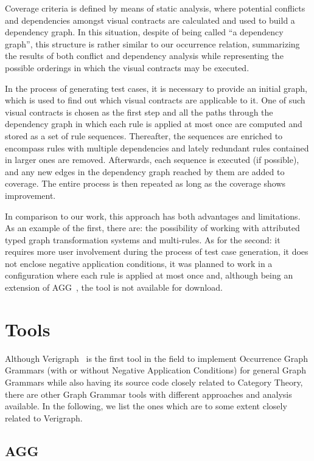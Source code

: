 Coverage criteria is defined by means of static analysis, where potential conflicts and dependencies amongst visual contracts are calculated and used to build a dependency graph. In this situation, despite of being called ``a dependency graph'', this structure is rather similar to our occurrence relation, summarizing the results of both conflict and dependency analysis while representing the possible orderings in which the visual contracts may be executed.

In the process of generating test cases, it is necessary to provide an initial graph, which is used to find out which visual contracts are applicable to it. One of such visual contracts is chosen as the first step and all the paths through the dependency graph in which each rule is applied at most once are computed and stored as a set of rule sequences. Thereafter, the sequences are enriched to encompass rules with multiple dependencies and lately redundant rules contained in larger ones are
removed. Afterwards, each sequence is executed (if possible), and any new edges in the dependency graph reached by them are added to coverage. The entire process is then repeated as long as the coverage shows improvement.

In comparison to our work, this approach has both advantages and limitations. As an example of the first, there are: the possibility of working with attributed typed graph transformation systems and multi-rules. 
As for the second: it requires more user involvement during the process of test case generation, it does not enclose negative application conditions, it was planned to work in a configuration where each rule is applied at most once and, although being an extension of AGG~\cite{Taentzer2000}, the tool is not available for download.

\section{Tools}

Although Verigraph~\cite{Costa2016, verigraph, Azzi2018} is the first tool in the field to implement Occurrence Graph Grammars (with or without Negative Application Conditions) for general Graph Grammars while also having its source code closely related to Category Theory, there are other Graph Grammar tools with different approaches and analysis available. In the following, we list the ones which are to some extent closely related to Verigraph.

\subsection{AGG}

